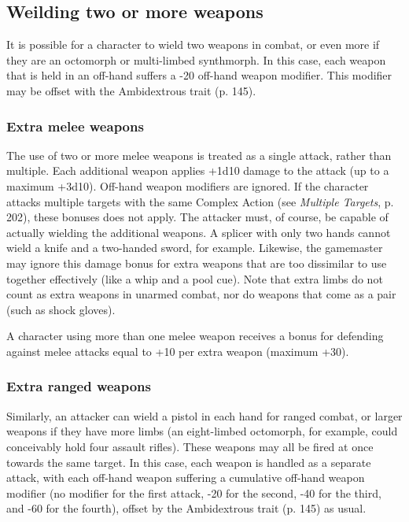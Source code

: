 \subsection{Weilding two or more weapons}
\label{sec:weilding-two-or-more}

It is possible for a character to wield two weapons in combat, or even more if they are an octomorph or multi-limbed synthmorph. In this case, each weapon that is held in an off-hand suffers a -20 off-hand weapon modifier. This modifier may be offset with the Ambidextrous trait (p. 145).

\subsubsection{Extra melee weapons}

The use of two or more melee weapons is treated as a single attack, rather than multiple. Each additional weapon applies +1d10 damage to the attack (up to a maximum +3d10). Off-hand weapon modifiers are ignored. If the character attacks multiple targets with the same Complex Action (see \emph{Multiple Targets}, p. 202), these bonuses does not apply. The attacker must, of course, be capable of actually wielding the additional weapons. A splicer with only two hands cannot wield a knife and a two-handed sword, for example. Likewise, the gamemaster may ignore this damage bonus for extra weapons that are too dissimilar to use together effectively (like a whip and a pool cue). Note that extra limbs do not count as extra weapons in unarmed combat, nor do weapons that come as a pair (such as shock gloves).

A character using more than one melee weapon receives a bonus for defending against melee attacks equal to +10 per extra weapon (maximum +30).

\subsubsection{Extra ranged weapons}

Similarly, an attacker can wield a pistol in each hand for ranged combat, or larger weapons if they have more limbs (an eight-limbed octomorph, for example, could conceivably hold four assault rifles). These weapons may all be fired at once towards the same target. In this case, each weapon is handled as a separate attack, with each off-hand weapon suffering a cumulative off-hand weapon modifier (no modifier for the first attack, -20 for the second, -40 for the third, and -60 for the fourth), offset by the Ambidextrous trait (p. 145) as usual.

